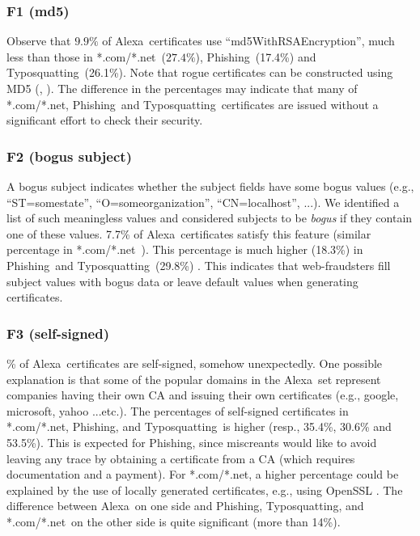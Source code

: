 \documentclass[twocolumn]{article}
\newcommand{\Alexa}{\textsf{Alexa}}
\newcommand{\phishing}{\textsf{Phishing}}
\newcommand{\typosquatting}{\textsf{Typosquatting}}
\newcommand{\comnet}{\textsf{*.com/*.net}}
\begin{document}
\subsubsection*{F1 (md5)} \noindent 
Observe that $9.9\%$ of \Alexa\ certificates use ``md5WithRSAEncryption'', much less than those in \comnet\ ($27.4\%$), 
\phishing\ (17.4\%) and \typosquatting\ (26.1\%). Note that rogue certificates can be constructed using MD5 (\cite{stevens2007chosen}, \cite{stevens2009short}). The difference in the percentages may indicate that  many of \comnet, \phishing\ and \typosquatting\ certificates are issued without a
significant effort to check their security.


\subsubsection*{F2 (bogus subject)} \noindent 
A bogus subject indicates whether the subject fields have some
bogus values (e.g., ``ST=somestate'',  ``O=someorganization'',
``CN=localhost'', ...). We identified a list of such meaningless values and 
considered subjects to be {\em bogus} if they contain one of these values. 7.7\% of \Alexa\ certificates
satisfy this feature (similar percentage in \comnet\ ). This percentage is much higher (18.3\%) in \phishing\ and \typosquatting\ (29.8\%) .
This indicates that web-fraudsters fill subject values
with bogus data or leave default values when generating certificates.


\subsubsection*{F3 (self-signed)} \% of \Alexa\
certificates are self-signed, somehow unexpectedly. One possible explanation is that some of the popular domains in 
the  \Alexa\ set represent companies having their own CA and issuing their own certificates (e.g., google, microsoft, yahoo ...etc.).
The percentages of self-signed certificates in \comnet, \phishing, and \typosquatting\ is higher (resp.,  35.4\%, 30.6\% and 53.5\%). 
This is expected for \phishing, since miscreants would like to avoid leaving any trace by obtaining a certificate from a 
CA (which requires documentation and a payment). For \comnet, a higher percentage could be explained  by the use of locally generated certificates, e.g.,  using OpenSSL \cite{openSSL}.
The difference between \Alexa\ on one side and \phishing, \typosquatting, and \comnet\ on the other side is quite significant (more than 14\%). 
\end{document}
